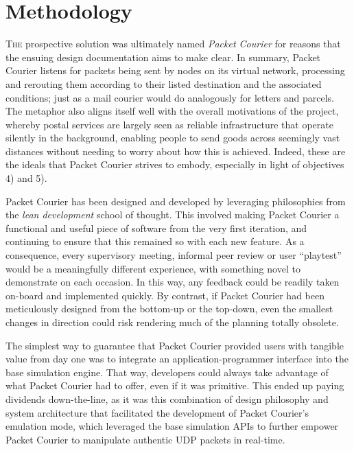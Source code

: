 \section{Methodology}\label{section:methodology}

\lettrine{T}{he} prospective solution was ultimately named \emph{Packet Courier} for reasons that the ensuing design
documentation aims to make clear. In summary, Packet Courier listens for packets being sent by nodes on its virtual
network, processing and rerouting them according to their listed destination and the associated conditions; just as a
mail courier would do analogously for letters and parcels. The metaphor also aligns itself well with the overall
motivations of the project, whereby postal services are largely seen as reliable infrastructure that operate silently
in the background, enabling people to send goods across seemingly vast distances without needing to worry about how
this is achieved. Indeed, these are the ideals that Packet Courier strives to embody, especially in light of
objectives 4) and 5).

Packet Courier has been designed and developed by leveraging philosophies from the \emph{lean development} school of
thought\cite{william_feld_lean_book, steve_blank_lean_blog}. This involved making Packet Courier a functional and
useful piece of software from the very first iteration, and continuing to ensure that this remained so with each new
feature. As a consequence, every supervisory meeting, informal peer review or user ``playtest'' would be a
meaningfully different experience, with something novel to demonstrate on each occasion. In this way, any feedback
could be readily taken on-board and implemented quickly. By contrast, if Packet Courier had been meticulously
designed from the bottom-up or the top-down, even the smallest changes in direction could risk rendering much of the
planning totally obsolete.

The simplest way to guarantee that Packet Courier provided users with tangible value from day one was to integrate an
application-programmer interface into the base simulation engine. That way, developers could always take advantage of
what Packet Courier had to offer, even if it was primitive. This ended up paying dividends down-the-line, as it was this
combination of design philosophy and system architecture that facilitated the development of Packet Courier's
emulation mode, which leveraged the base simulation APIs to further empower Packet Courier to manipulate authentic
UDP packets in real-time.


